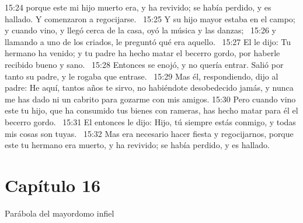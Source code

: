 15:24 porque este mi hijo muerto era, y ha revivido; se había perdido, y es hallado. Y comenzaron a regocijarse.  
15:25 Y su hijo mayor estaba en el campo; y cuando vino, y llegó cerca de la casa, oyó la música y las danzas;  
15:26 y llamando a uno de los criados, le preguntó qué era aquello.  
15:27 El le dijo: Tu hermano ha venido; y tu padre ha hecho matar el becerro gordo, por haberle recibido bueno y sano.  
15:28 Entonces se enojó, y no quería entrar. Salió por tanto su padre, y le rogaba que entrase.  
15:29 Mas él, respondiendo, dijo al padre: He aquí, tantos años te sirvo, no habiéndote desobedecido jamás, y nunca me has dado ni un cabrito para gozarme con mis amigos. 
15:30 Pero cuando vino este tu hijo, que ha consumido tus bienes con rameras, has hecho matar para él el becerro gordo.  
15:31 El entonces le dijo: Hijo, tú siempre estás conmigo, y todas mis cosas son tuyas.  
15:32 Mas era necesario hacer fiesta y regocijarnos, porque este tu hermano era muerto, y ha revivido; se había perdido, y es hallado.  
\section*{Capítulo 16 }
Parábola del mayordomo infiel  

